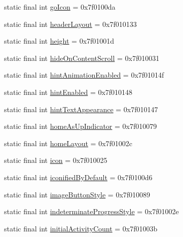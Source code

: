 \begin{CompactItemize}
static final int \hyperlink{classandroid_1_1support_1_1v7_1_1appcompat_1_1_r_1_1attr_900dccd18fa2271d4f852022b6c91a1e}{goIcon} = 0x7f0100da
\item 
static final int \hyperlink{classandroid_1_1support_1_1v7_1_1appcompat_1_1_r_1_1attr_3f47554d227f38f8ddc7dfbbf363102a}{headerLayout} = 0x7f010133
\item 
static final int \hyperlink{classandroid_1_1support_1_1v7_1_1appcompat_1_1_r_1_1attr_5a1e6899761c89ca4f5bc1f40241433c}{height} = 0x7f01001d
\item 
static final int \hyperlink{classandroid_1_1support_1_1v7_1_1appcompat_1_1_r_1_1attr_e7faeab462f1799f00c5b31b4eae42da}{hideOnContentScroll} = 0x7f010031
\item 
static final int \hyperlink{classandroid_1_1support_1_1v7_1_1appcompat_1_1_r_1_1attr_648c4d0450fae188ff69716c76467a43}{hintAnimationEnabled} = 0x7f01014f
\item 
static final int \hyperlink{classandroid_1_1support_1_1v7_1_1appcompat_1_1_r_1_1attr_289b89602da9832c08bed9b84494964e}{hintEnabled} = 0x7f010148
\item 
static final int \hyperlink{classandroid_1_1support_1_1v7_1_1appcompat_1_1_r_1_1attr_360493ea095131a07aba3429cd028a9d}{hintTextAppearance} = 0x7f010147
\item 
static final int \hyperlink{classandroid_1_1support_1_1v7_1_1appcompat_1_1_r_1_1attr_d4f9f893a5bbc87b81c7dd46742d2bd6}{homeAsUpIndicator} = 0x7f010079
\item 
static final int \hyperlink{classandroid_1_1support_1_1v7_1_1appcompat_1_1_r_1_1attr_806fa1e5334ab62f85d2a7691ad27f50}{homeLayout} = 0x7f01002c
\item 
static final int \hyperlink{classandroid_1_1support_1_1v7_1_1appcompat_1_1_r_1_1attr_e08d0217dddd341cad051ce71267b470}{icon} = 0x7f010025
\item 
static final int \hyperlink{classandroid_1_1support_1_1v7_1_1appcompat_1_1_r_1_1attr_4b2fd79dd4be3a982631c8e3c4f7b644}{iconifiedByDefault} = 0x7f0100d6
\item 
static final int \hyperlink{classandroid_1_1support_1_1v7_1_1appcompat_1_1_r_1_1attr_32010412be5ceb25660873530a6b2606}{imageButtonStyle} = 0x7f010089
\item 
static final int \hyperlink{classandroid_1_1support_1_1v7_1_1appcompat_1_1_r_1_1attr_e9bb96a8a2d374ec1a4ac02159707461}{indeterminateProgressStyle} = 0x7f01002e
\item 
static final int \hyperlink{classandroid_1_1support_1_1v7_1_1appcompat_1_1_r_1_1attr_9db1d544b5416e2c1a37458600707093}{initialActivityCount} = 0x7f01003b

\end{CompactItemize}
